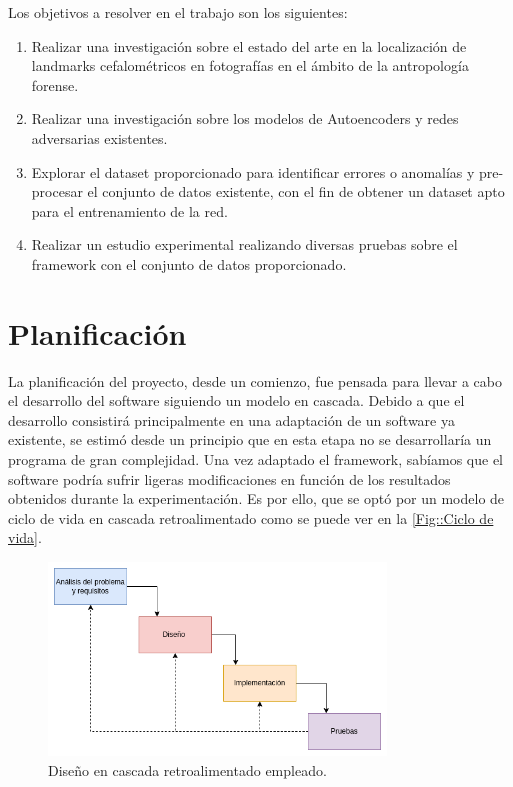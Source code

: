 \noindent Los objetivos a resolver en el trabajo son los siguientes: 

\begin{enumerate}
    \item Realizar una investigación sobre el estado del arte en la localización de landmarks cefalométricos en fotografías en el ámbito de la antropología forense.
    \item Realizar una investigación sobre los modelos de Autoencoders y redes adversarias existentes.
    \item Explorar el dataset proporcionado para identificar errores o anomalías y pre-procesar el conjunto de datos existente, con el fin de obtener un dataset apto para el entrenamiento de la red.
    \item Realizar un estudio experimental realizando diversas pruebas sobre el framework con el conjunto de datos proporcionado.
\end{enumerate}

\section{Planificación}
    \noindent La planificación del proyecto, desde un comienzo, fue pensada para llevar a cabo el desarrollo del software siguiendo un modelo en cascada. Debido a que el desarrollo consistirá principalmente en una adaptación de un software ya existente, se estimó desde un principio que en esta etapa no se desarrollaría un programa de gran complejidad. Una vez adaptado el framework, sabíamos que el software podría sufrir ligeras modificaciones en función de los resultados obtenidos durante la experimentación. Es por ello, que se optó por un modelo de ciclo de vida en cascada retroalimentado como se puede ver en la \autoref{Fig::Ciclo de vida}.


    \begin{figure}[!h]
        \centering
        \includegraphics[width=0.8\textwidth]{img/disenio_cascada.png}
        \caption{Diseño en cascada retroalimentado empleado.}
        \label{Fig::Ciclo de vida}
    \end{figure}

